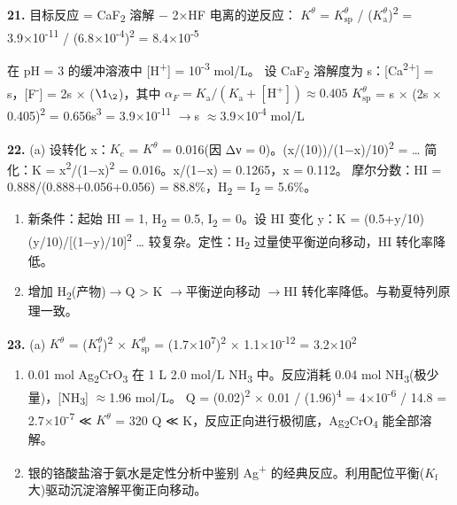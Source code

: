 \documentclass[a4paper,11pt]{ctexart}
\newcommand{\箭}{\ensuremath{\rightarrow}}
\newcommand{\左箭}{\ensuremath{\leftarrow}}
\newcommand{\上箭}{\ensuremath{\uparrow}}
\newcommand{\下箭}{\ensuremath{\downarrow}}
\newcommand{\衡}{\ensuremath{\rightleftharpoons}}
\newcommand{\双箭}{\ensuremath{\leftrightarrow}}
\newcommand{\约等于}{\ensuremath{\approx}}
\newcommand{\小于等于}{\ensuremath{\leq}}
\newcommand{\大于等于}{\ensuremath{\geq}}
\newcommand{\不等于}{\ensuremath{\neq}}
\newcommand{\西格马}{\ensuremath{\sigma}}
\newcommand{\派}{\ensuremath{\pi}}
\begin{document}
\textbf{21.} 目标反应 = CaF\textsubscript{2} 溶解 − 2×HF 电离的逆反应：
\(K^\theta\) = \(K_{\mathrm{sp}}^\theta\) / (\(K_{\mathrm a}^\theta\))\textsuperscript{2} = 3.9×10\textsuperscript{-11} / (6.8×10\textsuperscript{-4})\textsuperscript{2} = 8.4×10\textsuperscript{-5}

在 pH = 3 的缓冲溶液中 {[}H\textsuperscript{+}{]} = 10\textsuperscript{-3} mol/L。
设 CaF\textsubscript{2} 溶解度为 s：{[}Ca\textsuperscript{2+}{]} = s，{[}F\textsuperscript{-}{]} = 2s × (\(\1_{\2}\))，其中 \(\alpha_F = K_{\mathrm a}/(K_{\mathrm a}+[\mathrm{H^+}]) \approx 0.405\)
\(K_{\mathrm{sp}}^\theta\) = s × (2s × 0.405)\textsuperscript{2} = 0.656s\textsuperscript{3} = 3.9×10\textsuperscript{-11} \箭 s \约等于 3.9×10\textsuperscript{-4} mol/L

\textbf{22.}
(a) 设转化 x：\(K_{\mathrm c}\) = \(K^\theta\) = 0.016(因 Δν = 0)。(x/(10))/(1−x)/10)\textsuperscript{2} = \ldots{} 简化：K = x\textsuperscript{2}/(1−x)\textsuperscript{2} = 0.016。x/(1−x) = 0.1265，x = 0.112。
摩尔分数：HI = 0.888/(0.888+0.056+0.056) = 88.8\%，H\textsubscript{2} = I\textsubscript{2} = 5.6\%。

\begin{enumerate}
\def\labelenumi{(\alph{enumi})}
\setcounter{enumi}{1}
\item
  新条件：起始 HI = 1, H\textsubscript{2} = 0.5, I\textsubscript{2} = 0。设 HI 变化 y：K = (0.5+y/10)(y/10)/{[}(1−y)/10{]}\textsuperscript{2} \ldots{} 较复杂。定性：H\textsubscript{2} 过量使平衡逆向移动，HI 转化率降低。
\item
  增加 H\textsubscript{2}(产物)\箭 Q \textgreater{} K \箭 平衡逆向移动 \箭 HI 转化率降低。与勒夏特列原理一致。
\end{enumerate}

\textbf{23.}
(a) \(K^\theta\) = (\(K_{\mathrm f}^\theta\))\textsuperscript{2} × \(K_{\mathrm{sp}}^\theta\) = (1.7×10\textsuperscript{7})\textsuperscript{2} × 1.1×10\textsuperscript{-12} = 3.2×10\textsuperscript{2}

\begin{enumerate}
\def\labelenumi{(\alph{enumi})}
\setcounter{enumi}{1}
\item
  0.01 mol Ag\textsubscript{2}CrO\textsubscript{3} 在 1 L 2.0 mol/L NH\textsubscript{3} 中。反应消耗 0.04 mol NH\textsubscript{3}(极少量)，{[}NH\textsubscript{3}{]} \约等于 1.96 mol/L。
  Q = (0.02)\textsuperscript{2} × 0.01 / (1.96)\textsuperscript{4} = 4×10\textsuperscript{-6} / 14.8 = 2.7×10\textsuperscript{-7} ≪ \(K^\theta\) = 320
  Q ≪ K，反应正向进行极彻底，Ag\textsubscript{2}CrO\textsubscript{4} 能全部溶解。
\item
  银的铬酸盐溶于氨水是定性分析中鉴别 Ag\textsuperscript{+} 的经典反应。利用配位平衡(\(K_{\mathrm f}\) 大)驱动沉淀溶解平衡正向移动。
\end{enumerate}
\end{document}
